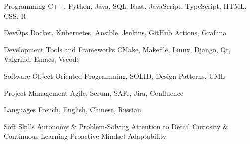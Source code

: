 
\begin{cvskills}

  \cvskill
    {Programming} %
    {C++, Python, Java, SQL, Rust, JavaScript, TypeScript, HTML, CSS, R} %

  \cvskill
    {DevOps} %
    {Docker, Kubernetes, Ansible, Jenkins, GitHub Actions, Grafana} %

  \cvskill
    {Development Tools and Frameworks} %
    {CMake, Makefile, Linux, Django, Qt, Valgrind, Emacs, Vscode} %

  \cvskill
    {Software} %
    {Object-Oriented Programming, SOLID, Design Patterns, UML} %

  \cvskill
    {Project Management} %
    {Agile, Scrum, SAFe, Jira, Confluence} %

  \cvskill
    {Languages} %
    {French, English, Chinese, Russian} %




\end{cvskills}


\begin{cvskills}
    \centering
    \setlength\itemindent{0pt} %
    \cvskill
      {Soft Skills} %
      {Autonomy \& Problem-Solving \newline Attention to Detail \newline Curiosity \& Continuous Learning \newline Proactive Mindset \newline Adaptability} %
\end{cvskills}



